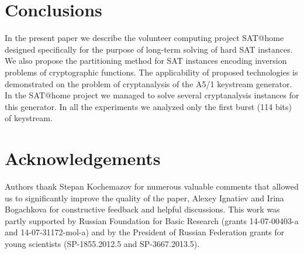 \documentclass[runningheads,a4paper]{llncs}
\begin{document}
\section{Conclusions}
In the present paper we describe the volunteer computing project SAT@home designed specifically for the purpose of long-term solving of hard SAT instances. We also propose the partitioning method for SAT instances encoding inversion problems of cryptographic functions. The applicability of proposed technologies is demonstrated on the problem of cryptanalysis of the A5/1 keystream generator. In the SAT@home project we managed to solve several cryptanalysis instances for this generator. In all the experiments we analyzed only the first burst (114 bits) of keystream.

\section{Acknowledgements}
Authors thank Stepan Kochemazov for numerous valuable comments that allowed us to significantly improve the quality of the paper, Alexey Ignatiev and Irina Bogachkova for constructive feedback and helpful discussions. This work was partly supported by Russian Foundation for Basic Research (grants 14-07-00403-a and 14-07-31172-mol-a) and by the President of Russian Federation grants for young scientists (SP-1855.2012.5 and SP-3667.2013.5).



\end{document}
